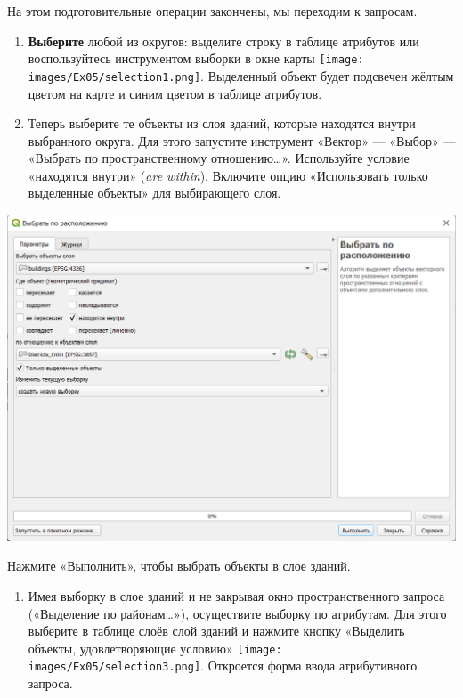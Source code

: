\documentclass[
  12pt,
]{book}
\providecommand{\tightlist}{%
  \setlength{\itemsep}{0pt}\setlength{\parskip}{0pt}}
\begin{document}
На этом подготовительные операции закончены, мы переходим к запросам.

\begin{enumerate}
\def\labelenumi{\arabic{enumi}.}
\setcounter{enumi}{2}
\item
  \textbf{Выберите} любой из округов: выделите строку в таблице атрибутов или воспользуйтесь инструментом выборки в окне карты \texttt{[image: images/Ex05/selection1.png]}. Выделенный объект будет подсвечен жёлтым цветом на карте и синим цветом в таблице атрибутов.
\item
  Теперь выберите те объекты из слоя зданий, которые находятся внутри выбранного округа. Для этого запустите инструмент «Вектор» --- «Выбор» --- «Выбрать по пространственному отношению\ldots». Используйте условие «находятся внутри» (\emph{are within}). Включите опцию «Использовать только выделенные объекты» для выбирающего слоя.
\end{enumerate}

\includegraphics{images/Ex05_Vectorization/selection2.png}

Нажмите «Выполнить», чтобы выбрать объекты в слое зданий.

\begin{enumerate}
\def\labelenumi{\arabic{enumi}.}
\setcounter{enumi}{5}
\tightlist
\item
  Имея выборку в слое зданий и не закрывая окно пространственного запроса («Выделение по районам\ldots»), осуществите выборку по атрибутам. Для этого выберите в таблице слоёв слой зданий и нажмите кнопку «Выделить объекты, удовлетворяющие условию» \texttt{[image: images/Ex05/selection3.png]}. Откроется форма ввода атрибутивного запроса.
\end{enumerate}
\end{document}
